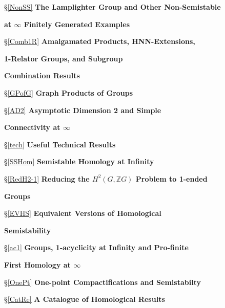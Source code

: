 \documentclass[12pt]{article}
\begin{document}
\noindent\hspace{1.2in} \S \ref{NonSS} {\bf The Lamplighter Group and Other Non-Semistable} 

\noindent\hspace{1.7in} {\bf at $\infty$ Finitely Generated Examples}

\noindent\hspace{1.2in} \S \ref{Comb1R} {\bf Amalgamated Products, HNN-Extensions,}

\noindent\hspace{1.7in} {\bf 1-Relator Groups, and Subgroup} 

\noindent\hspace{1.7in} {\bf Combination Results}

\noindent\hspace{1.2in} \S \ref{GPofG} {\bf Graph Products of Groups}

\noindent\hspace{1.2in} \S \ref{AD2} {\bf Asymptotic Dimension 2 and Simple} 

\noindent\hspace{1.7in} {\bf Connectivity at $\infty$}

\noindent\hspace{1.2in} \S \ref{tech} {\bf Useful Technical Results}

\noindent\hspace{.6 in} \S \ref{SSHom} {\bf Semistable Homology at Infinity}

\noindent\hspace{1.2in} \S \ref{RedH2-1} {\bf Reducing the $H^2(G,\mathbb ZG)$ Problem to 1-ended}

\noindent\hspace{1.7in} {\bf Groups}

\noindent\hspace{1.2in} \S \ref{EVHS} {\bf Equivalent Versions of Homological}

\noindent\hspace{1.7in} {\bf Semistability}

\noindent\hspace{1.2in} \S \ref{ac1} {\bf Groups, 1-acyclicity at Infinity and Pro-finite}  

\noindent\hspace{1.7in} {\bf First Homology at $\infty$ }

\noindent\hspace{1.2in} \S \ref{OnePt} {\bf One-point Compactifications and Semistabilty}

\noindent\hspace{1.2in} \S \ref{CatRe} {\bf A Catalogue of Homological Results} 
\end{document}
